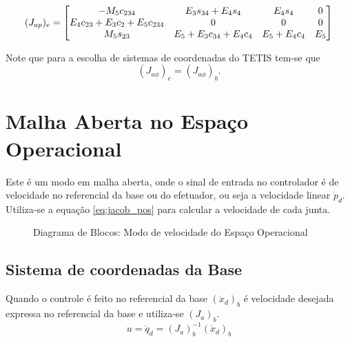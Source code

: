 \begin{equation}
({J}_{ap})_e =  
\begin{bmatrix}
    -M_5c_{234} & E_3s_{34}+E_4s_4 & E_4s_4 & 0 \\
    E_4c_{23}+E_3c_2+E_5c_{234} & 0 & 0 & 0 \\
    M_5s_{23} &  E_5+E_3c_{34}+E_4c_4 & E_5+E_4c_4 & E_5 
\end{bmatrix}
\end{equation}

Note que para a escolha de sistemas de coordenadas do TETIS tem-se que
\begin{equation}
(J_{a\phi})_e = (J_{a\phi})_b.
\end{equation}


\section{Malha Aberta no Espaço Operacional} 
Este é um modo em malha aberta, onde o sinal de entrada no controlador é de velocidade no referencial da base ou do efetuador, ou seja a velocidade linear ${\dot{p}}_d$. Utiliza-se a equação \eqref{eq:jacob_pos} para calcular a velocidade de cada junta. 

\begin{figure}[h!]
\centering
{}
\caption{Diagrama de Blocos: Modo de velocidade do Espaço Operacional}
\label{fig:vel_op}
\end{figure}


\subsection{Sistema de coordenadas da Base} \label{sec:openloopbase}
Quando o controle é feito no referencial da base $({\dot{x}}_d)_b$ é velocidade desejada expressa no referencial da base e utiliza-se $({J}_{a})_b$.
\begin{equation}
{u} = {\dot{q}}_d = ({J}_{a})_b^{-1} ({\dot{x}}_d)_b
\end{equation}
